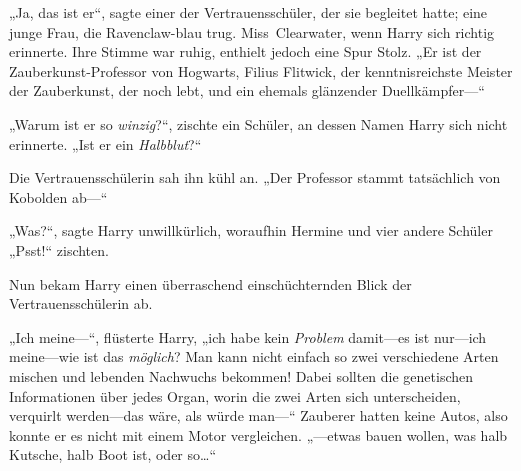 „Ja, das ist er“, sagte einer der Vertrauensschüler, der sie begleitet hatte; eine junge Frau, die Ravenclaw-blau trug. Miss~Clearwater, wenn Harry sich richtig erinnerte. Ihre Stimme war ruhig, enthielt jedoch eine Spur Stolz. „Er ist der Zauberkunst-Professor von Hogwarts, Filius Flitwick, der kenntnisreichste Meister der Zauberkunst, der noch lebt, und ein ehemals glänzender Duellkämpfer—“




„Warum ist er so \emph{winzig}?“, zischte ein Schüler, an dessen Namen Harry sich nicht erinnerte. „Ist er ein \emph{Halbblut}?“

Die Vertrauensschülerin sah ihn kühl an. „Der Professor stammt tatsächlich von Kobolden ab—“

„Was?“, sagte Harry unwillkürlich, woraufhin Hermine und vier andere Schüler „Psst!“ zischten.

Nun bekam Harry einen überraschend einschüchternden Blick der Vertrauensschülerin ab.

„Ich meine—“, flüsterte Harry, „ich habe kein \emph{Problem} damit—es ist nur—ich meine—wie ist das \emph{möglich}? Man kann nicht einfach so zwei verschiedene Arten mischen und lebenden Nachwuchs bekommen! Dabei sollten die genetischen Informationen über jedes Organ, worin die zwei Arten sich unterscheiden, verquirlt werden—das wäre, als würde man—“ Zauberer hatten keine Autos, also konnte er es nicht mit einem Motor vergleichen. „—etwas bauen wollen, was halb Kutsche, halb Boot ist, oder so…“

